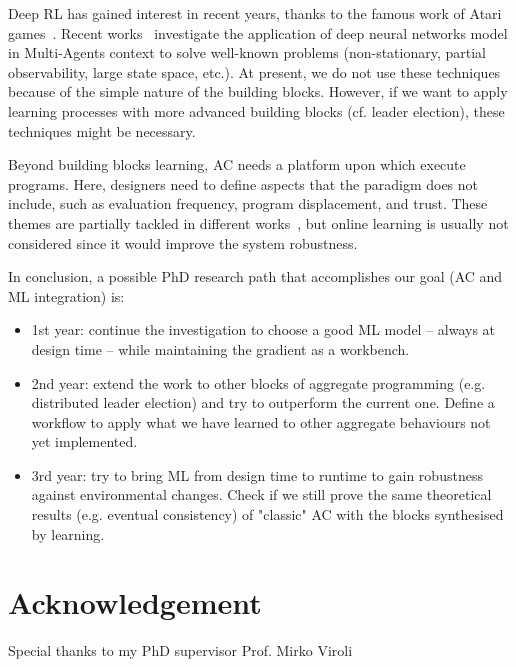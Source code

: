 \documentclass[conference]{IEEEtran}
\begin{document}
Deep RL has gained interest in recent years, thanks to the famous work of Atari games~\cite{DBLP:journals/corr/HosuR16}. 
%
Recent works~\cite{DBLP:journals/aamas/Hernandez-LealK19} investigate the application of deep neural networks model in Multi-Agents context to solve well-known problems (non-stationary, partial observability, large state space, etc.). 
%
At present, we do not use these techniques because of the simple nature of the building blocks. However, if we want to apply learning processes with more advanced building blocks (cf. leader election), these techniques might be necessary.

Beyond building blocks learning, AC needs a platform upon which execute programs. 
%
Here, designers need to define aspects that the paradigm does not include, such as evaluation frequency, program displacement, and trust.
% 
These themes are partially tackled in different works~\cite{DBLP:journals/scp/CasadeiAV18, DBLP:journals/fi/CasadeiPPVW20, DBLP:journals/corr/abs-2012-13806}, but online learning is usually not considered since it would improve the system robustness.

%
%
In conclusion, a possible PhD research path that accomplishes our goal (AC and ML integration) is:
\begin{itemize}
    \item 1st year: continue the investigation to choose a good ML model -- always at design time -- while maintaining the gradient as a workbench.
    \item 2nd year: extend the work to other blocks of aggregate programming (e.g. distributed leader election) and try to outperform the current one. Define a workflow to apply what we have learned to other aggregate behaviours not yet implemented.
    \item 3rd year: try to bring ML from design time to runtime to gain robustness against environmental changes. Check if we still prove the same theoretical results (e.g. eventual consistency) of "classic" AC with the blocks synthesised by learning.
\end{itemize}
\section*{Acknowledgement}
Special thanks to my PhD supervisor Prof. Mirko Viroli


\end{document}
